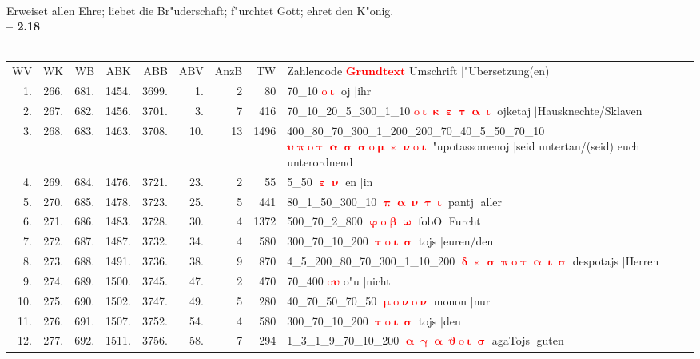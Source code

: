 \documentclass[a4paper,10pt,landscape]{article}
\begin{document}
\\
Erweiset allen Ehre; liebet die Br"uderschaft; f"urchtet Gott; ehret den K"onig.\\
\newpage 
{\bf -- 2.18}\\
\medskip \\
\begin{tabular}{rrrrrrrrp{120mm}}
WV&WK&WB&ABK&ABB&ABV&AnzB&TW&Zahlencode \textcolor{red}{$\boldsymbol{Grundtext}$} Umschrift $|$"Ubersetzung(en)\\
1.&266.&681.&1454.&3699.&1.&2&80&70\_10 \textcolor{red}{$\boldsymbol{\mathrm{o}\upiota}$} oj $|$ihr\\
2.&267.&682.&1456.&3701.&3.&7&416&70\_10\_20\_5\_300\_1\_10 \textcolor{red}{$\boldsymbol{\mathrm{o}\upiota\upkappa\upepsilon\uptau\upalpha\upiota}$} ojketaj $|$Hausknechte/Sklaven\\
3.&268.&683.&1463.&3708.&10.&13&1496&400\_80\_70\_300\_1\_200\_200\_70\_40\_5\_50\_70\_10 \textcolor{red}{$\boldsymbol{\upsilon\uppi\mathrm{o}\uptau\upalpha\upsigma\upsigma\mathrm{o}\upmu\upepsilon\upnu\mathrm{o}\upiota}$} "upotassomenoj $|$seid untertan/(seid) euch unterordnend\\
4.&269.&684.&1476.&3721.&23.&2&55&5\_50 \textcolor{red}{$\boldsymbol{\upepsilon\upnu}$} en $|$in\\
5.&270.&685.&1478.&3723.&25.&5&441&80\_1\_50\_300\_10 \textcolor{red}{$\boldsymbol{\uppi\upalpha\upnu\uptau\upiota}$} pantj $|$aller\\
6.&271.&686.&1483.&3728.&30.&4&1372&500\_70\_2\_800 \textcolor{red}{$\boldsymbol{\upvarphi\mathrm{o}\upbeta\upomega}$} fobO $|$Furcht\\
7.&272.&687.&1487.&3732.&34.&4&580&300\_70\_10\_200 \textcolor{red}{$\boldsymbol{\uptau\mathrm{o}\upiota\upsigma}$} tojs $|$euren/den\\
8.&273.&688.&1491.&3736.&38.&9&870&4\_5\_200\_80\_70\_300\_1\_10\_200 \textcolor{red}{$\boldsymbol{\updelta\upepsilon\upsigma\uppi\mathrm{o}\uptau\upalpha\upiota\upsigma}$} despotajs $|$Herren\\
9.&274.&689.&1500.&3745.&47.&2&470&70\_400 \textcolor{red}{$\boldsymbol{\mathrm{o}\upsilon}$} o"u $|$nicht\\
10.&275.&690.&1502.&3747.&49.&5&280&40\_70\_50\_70\_50 \textcolor{red}{$\boldsymbol{\upmu\mathrm{o}\upnu\mathrm{o}\upnu}$} monon $|$nur\\
11.&276.&691.&1507.&3752.&54.&4&580&300\_70\_10\_200 \textcolor{red}{$\boldsymbol{\uptau\mathrm{o}\upiota\upsigma}$} tojs $|$den\\
12.&277.&692.&1511.&3756.&58.&7&294&1\_3\_1\_9\_70\_10\_200 \textcolor{red}{$\boldsymbol{\upalpha\upgamma\upalpha\upvartheta\mathrm{o}\upiota\upsigma}$} agaTojs $|$guten\\

\end{tabular}
\end{document}
